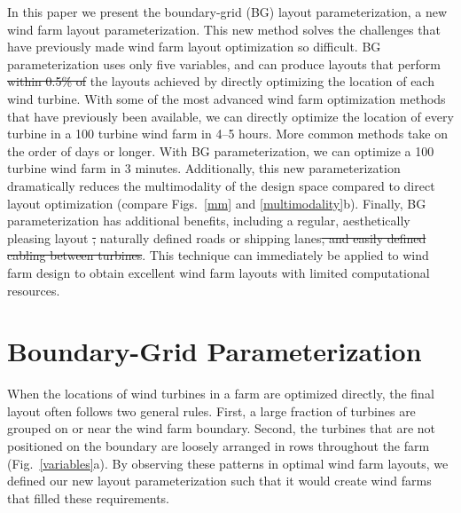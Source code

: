 \documentclass[wes, manuscript]{copernicus}
\providecommand{\DIFadd}[1]{{\protect\color{blue}\uwave{#1}}} %
\providecommand{\DIFdel}[1]{{\protect\color{red}\sout{#1}}}                      %
\providecommand{\DIFaddbegin}{} %
\providecommand{\DIFaddend}{} %
\providecommand{\DIFdelbegin}{} %
\providecommand{\DIFdelend}{} %
\begin{document}
In this paper we present the boundary-grid (BG) layout parameterization, a new wind farm layout parameterization. This new method solves the challenges that have previously made wind farm layout optimization so difficult. BG parameterization uses only five variables, and can produce layouts that perform \DIFdelbegin \DIFdel{within 0.5\% of }\DIFdelend \DIFaddbegin \DIFadd{just as well as or better than }\DIFaddend the layouts achieved by directly optimizing the location of each wind turbine. 
With some of the most advanced wind farm optimization methods that have previously been available, we can directly optimize the location of every turbine in a 100 turbine wind farm in 4--5 hours. More common methods take on the order of days or longer. With BG parameterization, we can optimize a 100 turbine wind farm in 3 minutes. Additionally, this new parameterization dramatically reduces the multimodality of the design space compared to direct layout optimization (compare Figs.~\ref{mm} and \ref{multimodality}b). Finally, BG parameterization has additional benefits, including a regular, aesthetically pleasing layout \DIFdelbegin \DIFdel{, }\DIFdelend \DIFaddbegin \DIFadd{and }\DIFaddend naturally defined roads or shipping lanes\DIFdelbegin \DIFdel{, and easily defined cabling between turbines}\DIFdelend . This technique can immediately be applied to wind farm design to obtain excellent wind farm layouts with limited computational resources.


\section{Boundary-Grid Parameterization}
When the locations of wind turbines in a farm are optimized directly, the final layout often follows two general rules. First, a large fraction of turbines are grouped on or near the wind farm boundary. Second, the turbines that are not positioned on the boundary are loosely arranged in rows throughout the farm (Fig.~\ref{variables}a). 
By observing these patterns in optimal wind farm layouts, we defined our new layout parameterization such that it would create wind farms that filled these requirements.
\end{document}

